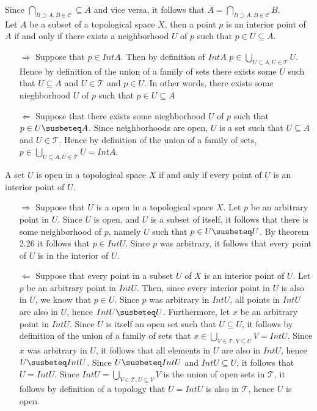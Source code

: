 \documentclass{article}
\theoremstyle{definition}
\newcommand{\topT}{\mathcal{T}}
\newcommand{\cc}{\mathcal{C}}
\begin{document}
Since $\bigcap_{B\supset A, B\in \cc} \subseteq \overline{A}$ and vice versa, it follows that $\overline{A} = \bigcap_{B\supset A, B\in \cc}B .$\\


 Let $A$ be a subset of a topological space $X$, then a point $p$ is an interior point of $A$ if and only if there exists a neighborhood $U$ of $p$ such that $p\in U\subseteq A$.\\

\begin{itemize}
    \item[$\Rightarrow$] Suppose that $p\in Int A$. Then by definition of $Int A$ $p\in \bigcup_{U\subset A,U\in \topT}U$. Hence by definition of the union of a family of sets there exists some $U$ such that $U\subseteq A$ and $U\in \topT$ and $p\in U$. In other words, there exists some nieghborhood $U$ of $p$ such that $p\in U\subseteq A$ 
    \item[$\Leftarrow$] Suppose that there exists some nieghborhood $U$ of $p$ such that $p\in U\susbeteq A$. Since neighborhoods are open, $U$ is a set such that $U\subseteq A$ and $U\in \topT$. Hence by definition of the union of a family of sets, $p\in \bigcup_{U\subseteq A, U\in \topT}U = Int A$.
\end{itemize}

 A set $U$ is open in a topological space $X$ if and only if every point of $U$ is an interior point of $U$. 

\begin{itemize}
    \item[$\Rightarrow$] Suppose that $U$ is a open in a topological space $X$. Let $p$ be an arbitrary point in $U$. Since $U$ is open, and $U$ is a subset of itself, it follows that there is some neighborhood of $p$, namely $U$ such that $p\in U\susbeteq U$. By theorem 2.26 it follows that $p\in Int U$. Since $p$ was arbitrary, it follows that every point of $U$ is in the interior of $U$.
    \item[$\Leftarrow$] Suppose that every point in a subset $U$ of $X$ is an interior point of $U$. Let $p$ be an arbitrary point in $Int U$. Then, since every interior point in $U$ is also in $U$, we know that $p\in U$. Since $p$ was arbitrary in $Int U$, all points in $Int U$ are also in $U$, hence $Int U\susbeteq U$. Furthermore, let $x$ be an arbitrary point in $Int U$. Since $U$ is itself an open set such that $U\subseteq U$, it follows by definition of the union of a family of sets that $x\in \bigcup_{V\in \topT, V \subseteq U}V = Int U$. Since $x$ was arbitrary in $U$, it follows that all elements in $U$ are also in $Int U$, hence $U\susbeteq Int U$. Since $U\susbeteq Int U$ and $Int U \subseteq U$, it follows that $U = Int U$. Since $Int U = \bigcup_{V\in \topT, U \subseteq V} V$ is the union of open sets in $\topT$, it follows by definition of a topology that $U = Int U$ is also in $\topT$, hence $U$ is open.
    \end{itemize}
\end{document}

